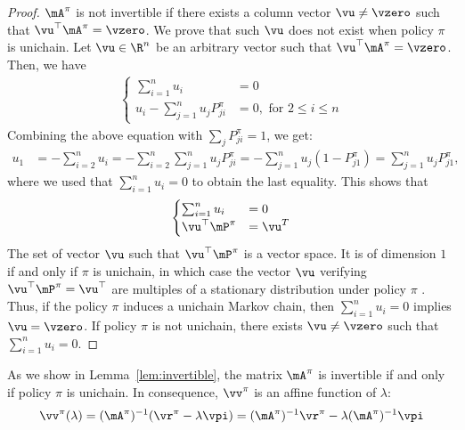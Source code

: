 \begin{proof}
    $\mA^\pi$ is not invertible if there exists a column vector $\vu\neq\vzero$ such that $\vu^\top \mA^\pi=\vzero$.
    We prove that such $\vu$ does not exist when policy $\pi$ is unichain.
    Let $\vu\in\R^n$ be an arbitrary vector such that $\vu^\top \mA^\pi=\vzero$.
    Then, we have
    \begin{align*}
        \begin{cases}
            \sum_{i=1}^{n}u_i &= 0 \\
            u_i-\sum_{j=1}^{n}u_jP_{ji}^\pi &= 0, \text{ for } 2\le i\le n
        \end{cases}
    \end{align*}
    Combining the above equation with $\sum_j P^\pi_{ji}=1$, we get:
    \begin{align*}
        u_1 &= -\sum_{i=2}^n u_i
        =-\sum_{i=2}^n\sum_{j=1}^n u_j P^\pi_{ji}
        =-\sum_{j=1}^n u_j (1-P^\pi_{j1})
        = \sum_{j=1}^n u_j P^\pi_{j1},
    \end{align*}
    where we used that $\sum_{i=1}^{n}u_i=0$ to obtain the last equality.  
    This shows that 
    \begin{align*}
        \begin{cases}
            \sum_{i=1}^{n}u_i &= 0 \\
            \vu^\top\mP^\pi &=\vu^T
        \end{cases}
    \end{align*}
    The set of vector $\vu$ such that $\vu^\top\mP^\pi$ is a vector space. It is of dimension $1$ if and only if $\pi$ is unichain, in which case the vector $\vu$ verifying $\vu^\top\mP^\pi=\vu^\top$ are multiples of a stationary distribution under policy $\pi$ \cite{puterman2014markov}. Thus, if the policy $\pi$ induces a unichain Markov chain, then $\sum_{i=1}^{n}u_i = 0$ implies $\vu = \vzero$. If policy $\pi$ is not unichain, there exists $\vu\ne\vzero$ such that $\sum_{i=1}^{n}u_i = 0$.
\end{proof}

As we show in Lemma~\ref{lem:invertible}, the matrix $\mA^{\pi}$ is invertible if and only if policy $\pi$ is unichain. In consequence, $\vv^{\pi}$ is an affine function of $\lambda$:
\begin{align}
    \label{eq:h is linear}
    \vv^{\pi}(\lambda) = (\mA^{\pi})^{-1}(\vr^{\pi} - \lambda \vpi) =(\mA^{\pi})^{-1}\vr^\pi - \lambda (\mA^{\pi})^{-1}\vpi
\end{align}

